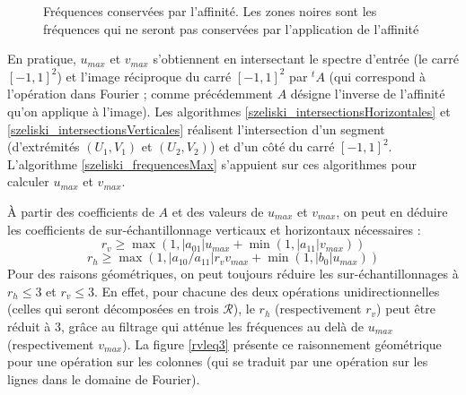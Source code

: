 \begin{figure}
		\caption{Fréquences conservées par l'affinité. Les zones noires sont les fréquences qui ne seront pas conservées par l'application de l'affinité}
		\label{uMax_vMax}
		\end{figure}
		
		En pratique, $u_{max}$ et $v_{max}$ s'obtiennent en intersectant le spectre d'entrée (le carré $[-1,1]^2$) et l'image réciproque du carré $[-1,1]^2$ par $^t\!A$ (qui correspond à l'opération dans Fourier ; comme précédemment $A$ désigne l'inverse de l'affinité qu'on applique à l'image). Les algorithmes \ref{szeliski_intersectionsHorizontales} et \ref{szeliski_intersectionsVerticales} réalisent l'intersection d'un segment (d'extrémités $(U_1,V_1)$ et $(U_2,V_2)$) et d'un côté du carré $[-1,1]^2$. L'algorithme \ref{szeliski_frequencesMax} s'appuient sur ces algorithmes pour calculer $u_{max}$ et $v_{max}$.
		
		À partir des coefficients de $A$ et des valeurs de $u_{max}$ et $v_{max}$, on peut en déduire les coefficients de sur-échantillonnage verticaux et horizontaux nécessaires \cite{szeliski2010high} :
		\[r_v \geq \max (1,|a_{01}|u_{max}+\min (1,|a_{11}|v_{max}))\]
		\[r_h \geq \max (1,|a_{10}/a_{11}|r_vv_{max}+\min (1,|b_0|u_{max}))\]
		Pour des raisons géométriques, on peut toujours réduire les sur-échantillonnages à $r_h \leq 3$ et $r_v \leq 3$. En effet, pour chacune des deux opérations unidirectionnelles (celles qui seront décomposées en trois $\mathcal R$), le $r_h$ (respectivement $r_v$) peut être réduit à 3, grâce au filtrage qui atténue les fréquences au delà de $u_{max}$ (respectivement $v_{max}$). La figure \ref{rvleq3} présente ce raisonnement géométrique pour une opération sur les colonnes (qui se traduit par une opération sur les lignes dans le domaine de Fourier).
		
